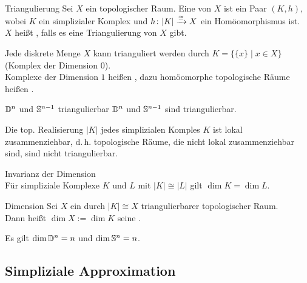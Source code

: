 \begin{Def}{Triangulierung}
    Sei $X$ ein topologischer Raum.
    Eine  von $X$ ist ein Paar $(K, h)$, wobei
    $K$ ein simplizialer Komplex und $h\colon |K| \xrightarrow{\cong} X$ ein
    Homöomorphismus ist. \\
    $X$ heißt ,
    falls es eine Triangulierung von $X$ gibt.
\end{Def}

\begin{Bsp}
    Jede diskrete Menge $X$ kann trianguliert werden durch
    $K = \{\{x\} \;|\; x \in X\}$ (Komplex der Dimension $0$). \\
    Komplexe der Dimension $1$ heißen ,
    dazu homöomorphe topologische Räume heißen .
\end{Bsp}

\begin{Satz}{$\mathbb{D}^n$ und $\mathbb{S}^{n-1}$ triangulierbar}
    $\mathbb{D}^n$ und $\mathbb{S}^{n-1}$ sind triangulierbar.
\end{Satz}

\begin{Bem}
    Die top. Realisierung $|K|$ jedes simplizialen Komples $K$ ist
    lokal zusammenziehbar, d.\,h. topologische Räume, die nicht
    lokal zusammenziehbar sind, sind nicht triangulierbar.
\end{Bem}

\linie

\begin{Satz}{Invarianz der Dimension}\\
    Für simpliziale Komplexe $K$ und $L$ mit $|K| \cong |L|$ gilt
    $\dim K = \dim L$.
\end{Satz}

\begin{Def}{Dimension}
    Sei $X$ ein durch $|K| \cong X$ triangulierbarer topologischer Raum. \\
    Dann heißt $\dim X := \dim K$ seine .
\end{Def}

\begin{Bsp}
    Es gilt $\dim \mathbb{D}^n = n$ und $\dim \mathbb{S}^n = n$.
\end{Bsp}

\pagebreak

\subsection{%
    Simpliziale Approximation%
}

